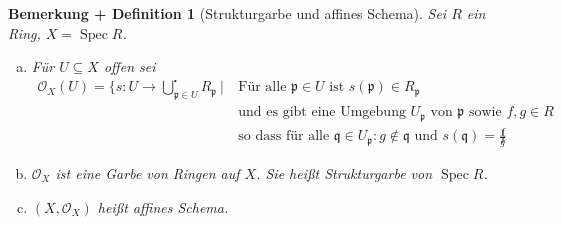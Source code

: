 \documentclass[a4paper,oneside]{scrbook}
\theoremstyle{break}
\newtheorem{BemDef}[Def]{Bemerkung + Definition}
\theoremstyle{nonumberbreak}
\theoremstyle{nonumberplain}
\theoremstyle{break}
\newcommand{\Spec}{%
	\ensuremath{\operatorname{Spec}}%
}
\begin{document}
\begin{BemDef}[Strukturgarbe und affines Schema]
	\label{defbem:structure_germ}
	Sei $R$ ein Ring, $X = \Spec R$.
	\begin{enumerate}[(a)]
		\item Für $U \subseteq X$ offen sei
		\begin{align*}
			\mathcal{O}_X\left(U\right) = 
				\bigg\{ s\colon U \to \bigcup_{ \mathfrak{p} \in U }^{\centerdot} R_{\mathfrak{p}}\ \bigg|\
					& \text{Für alle } \mathfrak{p} \in U \text{ ist } s\left(\mathfrak{p}\right) \in R_{\mathfrak{p}}\\
					& \text{und es gibt eine Umgebung } U_{\mathfrak{p}} \text{ von } \mathfrak{p}
					\text{ sowie } f,g \in R\\ 
					& \text{so dass für alle } \mathfrak{q} \in U_{\mathfrak{p}}\colon g \notin \mathfrak{q} 
					\text{ und } s\left(\mathfrak{q}\right) = \frac{f}{g}
					& \bigg\}
		\end{align*}
		\item $\mathcal{O}_X$ ist eine Garbe von Ringen auf $X$. Sie heißt \emph{Strukturgarbe} von $\Spec R$.
		\item $\left(X, \mathcal{O}_X\right)$ heißt \emph{affines Schema}.
	\end{enumerate}
\end{BemDef}
\end{document}
